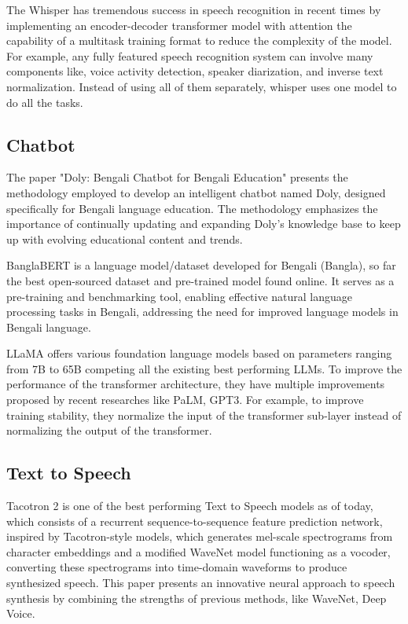 The Whisper has tremendous success in speech recognition in recent times by implementing an encoder-decoder transformer model with attention the capability of a multitask training format to reduce the complexity of the model. \cite{whisper}
For example, any fully featured speech recognition system can involve many components like, voice activity detection, speaker diarization, and inverse text normalization.
Instead of using all of them separately, whisper uses one model to do all the tasks.

\subsection{Chatbot}\label{subsec:chatbot}
The paper "Doly: Bengali Chatbot for Bengali Education" \cite{doly} presents the methodology employed to develop an intelligent chatbot named Doly, designed specifically for Bengali language education.
The methodology emphasizes the importance of continually updating and expanding Doly's knowledge base to keep up with evolving educational content and trends.

BanglaBERT is a language model/dataset developed for Bengali (Bangla), so far the best open-sourced dataset and pre-trained model found online. \cite{bangla-bert}
It serves as a pre-training and benchmarking tool, enabling effective natural language processing tasks in Bengali, addressing the need for improved language models in Bengali language.

LLaMA offers various foundation language models based on parameters ranging from 7B to 65B competing all the existing best performing LLMs. \cite{LLaMA}
To improve the performance of the transformer architecture, they have multiple improvements proposed by recent researches like PaLM, GPT3.
For example, to improve training stability, they normalize the input of the transformer sub-layer instead of normalizing the output of the transformer.


\subsection{Text to Speech}\label{subsec:tts}
Tacotron 2 is one of the best performing Text to Speech models as of today, which consists of a recurrent sequence-to-sequence  feature prediction network, inspired by Tacotron-style models, which generates mel-scale spectrograms from character embeddings and a modified WaveNet model functioning as a vocoder, converting these spectrograms into time-domain waveforms to produce synthesized speech. \cite {tacotron}
This paper presents an innovative neural approach to speech synthesis by combining the strengths of previous methods, like WaveNet, Deep Voice.

